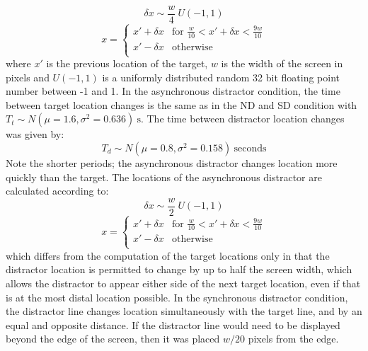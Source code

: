 \documentclass[10pt,letterpaper]{article}
\begin{document}
\begin{equation}\label{eq:rand_loc_offset_sync}
  {\delta}x \sim \frac{w}{4}~U(-1,1)
\end{equation}
\begin{equation}\label{eq:new_loc_sync}
  x=
  \begin{cases}
    x' + {\delta}x & \text{for }\frac{w}{10}<x'+{\delta}x<\frac{9w}{10}\\
    x' - {\delta}x & \text{otherwise}\\
  \end{cases}
\end{equation}
where $x'$ is the previous location of the target, $w$ is the width of
the screen in pixels and $U(-1,1)$ is a uniformly distributed random
32 bit floating point number between -1 and 1.  In the asynchronous
distractor condition, the time between target location changes is the
same as in the ND and SD condition with $T_t \sim
N(\mu=1.6,\sigma^2=0.636)~\text{s}$. The time between distractor
location changes was given by:
%
%
%
%
\begin{equation}\label{eq:tau_distractor_async}
  T_d \sim N(\mu=0.8,\sigma^2=0.158)~\text{seconds}
\end{equation}
Note the shorter periods; the asynchronous distractor changes location
more quickly than the target.
The locations of the asynchronous distractor are calculated according to:
\begin{equation}\label{eq:rand_loc_offset_async}
  {\delta}x \sim \frac{w}{2}~U(-1,1)
\end{equation}
\begin{equation}\label{eq:new_loc_async}
  x=
  \begin{cases}
    x' + {\delta}x & \text{for }\frac{w}{10}<x'+{\delta}x<\frac{9w}{10}\\
    x' - {\delta}x & \text{otherwise}\\
  \end{cases}
\end{equation}
which differs from the computation of the target locations only in
that the distractor location is permitted to change by up to half the
screen width, which allows the distractor to appear either side of the
next target location, even if that is at the most distal location
possible.  In the synchronous distractor condition, the distractor
line changes location simultaneously with the target line, and by an
equal and opposite distance. If the distractor line would need to be
displayed beyond the edge of the screen, then it was placed $w/20$
pixels from the edge.
\end{document}
